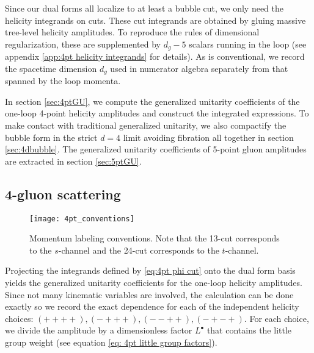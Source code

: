 \documentclass[11pt]{article}
\begin{document}
Since our dual forms all localize to at least a bubble cut, we only need the helicity integrands on cuts. These cut integrands are obtained by gluing massive tree-level helicity amplitudes. To reproduce the rules of dimensional regularization, these are supplemented by $d_g-5$ scalars running in the loop (see appendix \ref{app:4pt helicity integrands} for details).
As is conventional, we record the spacetime dimension $d_g$ used in numerator algebra separately from that spanned by the loop momenta.

In section \ref{sec:4ptGU}, we compute the generalized unitarity coefficients of the one-loop 4-point helicity amplitudes and construct the integrated expressions. 
To make contact with traditional generalized unitarity, we also compactify the bubble form in the strict $d=4$ limit avoiding fibration all together in section \ref{sec:4dbubble}. 
The generalized unitarity coefficients of 5-point gluon amplitudes are extracted in section \ref{sec:5ptGU}.


\subsection{4-gluon scattering \label{sec:4ptGU}}

\begin{figure}
\centering
\texttt{[image: 4pt\_conventions]}
\caption{ \label{fig:4pt conventions}
	Momentum labeling conventions. Note that the 13-cut corresponds to the $s$-channel and the 24-cut corresponds to the $t$-channel. 
}
\end{figure}


Projecting the integrands defined by \eqref{eq:4pt phi cut} onto the dual form basis yields the generalized unitarity coefficients for the one-loop helicity amplitudes.
Since not many kinematic variables are involved, the calculation can be done exactly so we record the exact dependence for each of the independent helicity choices: $(++++),(-+++),(--++),(-+-+)$.  
For each choice, we divide the amplitude by a dimensionless factor $L^\bullet$ that contains the little group weight (see equation \eqref{eq: 4pt little group factors}).
\end{document}
